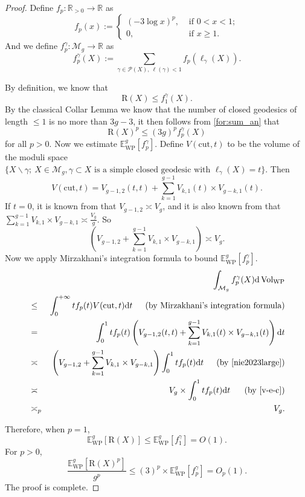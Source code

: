 \documentclass[UTF8]{amsart}
\numberwithin{equation}{section}
\theoremstyle{definition}
\theoremstyle{example}
\theoremstyle{remark}
\DeclareMathOperator{\vol}{Vol_{WP}}
\begin{document}
\begin{proof}
	Define $f_p: \mathbb{R}_{>0} \to \mathbb{R}$ as 
\[
	f_p(x) :=
	\begin{cases}
		(-3\log x)^p, &\text{ if }0 <x< 1;\\
		0, & \text{ if } x \ge  1 . 
	\end{cases}
\]
And we define $f^{\gamma}_p: \mathcal{M}_g \to \mathbb{R}$ as 
\[
	f^{\gamma}_p(X) := \sum\limits_{\gamma \in \mathcal{P}(X), \ \ell(\gamma) <1} f_p \left( \ell_{\gamma}(X) \right). 
\]

\noindent By definition, we know that $$\mathrm{R}(X) \le f^{\gamma}_1(X).$$ By the classical Collar Lemma we know that the number of closed geodesics of length $\leq 1$ is no more than $3g-3$, it then follows from \eqref{for:sum_an} that $$\mathrm{R}(X)^p \le (3g)^p f^{\gamma}_p(X)$$ for all $p>0$. Now we estimate $\mathbb{E}_{\mathrm{WP}}^{g}[f^{\gamma}_p]$. 
Define $V(\text{cut},t)$ to be the volume of the moduli space $\{X \backslash \gamma; \ X\in \mathcal{M}_g, \gamma\subset X \text{ is a simple closed geodesic with }\ell_{\gamma}(X)=t \}$. Then
\[
	V(\text{cut},t) = V_{g-1,2}(t,t) + \sum_{k=1}^{g-1} V_{k,1}(t)\times V_{g-k,1}(t).
\]
If $t=0$, it is known from \cite[Theorem 3.5]{mirzakhani2013growth} that $V_{g-1,2}\asymp V_g$, and it is also known from \cite[Corollary 3.7]{mirzakhani2013growth} that $\sum_{k=1}^{g-1} V_{k,1}\times V_{g-k,1} \asymp \frac{V_g}{g}$. So 
\begin{equation}\label{v-e-c}
\left(V_{g-1,2} + \sum_{k=1}^{g-1} V_{k,1}\times V_{g-k,1}\right)\asymp V_g.  
\end{equation}
\noindent Now we apply Mirzakhani's integration formula \cite[Theorem 7.1]{mirzakhani2007simple} to bound $\mathbb{E}_{\mathrm{WP}}^{g}[f^{\gamma}_p]$. 
\begin{eqnarray*}
	&&\int_{\mathcal{M}_g} f_p^{\gamma}(X) \mathrm{d}\vol \\
	&\leq &\int_{0}^{+\infty} tf_p(t) V(\text{cut},t)\mathrm{d}t \text{\,\,\,\quad (by Mirzakhani's integration formula)}\\
							  &=& \int_0^{1}tf_p(t) \left( V_{g-1,2}(t,t) + \sum_{k=1}^{g-1} V_{k,1}(t)\times V_{g-k,1}(t) \right) \mathrm{d}t \\
							  &\asymp & \left( V_{g-1,2} + \sum_{k=1}^{g-1} V_{k,1}\times V_{g-k,1} \right)\int_0^{1}tf_p(t)\mathrm{d}t \text{\,\,\,\quad (by \cite[Lemma 22]{nie2023large})} \\
							  & \asymp &V_g \times \int_0^{1}tf_p(t)\mathrm{d}t  \text{\,\,\,\,\quad (by \eqref{v-e-c})}\\
							  & \asymp_p & V_{g} .
\end{eqnarray*}

\noindent Therefore, when $p=1$, 
\[
	\mathbb{E}_{\mathrm{WP}}^{g}[\mathrm{R}(X)] \le \mathbb{E}_{\mathrm{WP}}^{g}[f_1^{\gamma}] = O(1). 
\]
For $p > 0$, 
\[
	\frac{\mathbb{E}_{\mathrm{WP}}^{g}[\mathrm{R}(X)^p]}{g^p} \le (3)^p\times\mathbb{E}_{\mathrm{WP}}^{g}[f_p^{\gamma}] = O_p(1). 
\]
The proof is complete. 
\end{proof}
\end{document}
